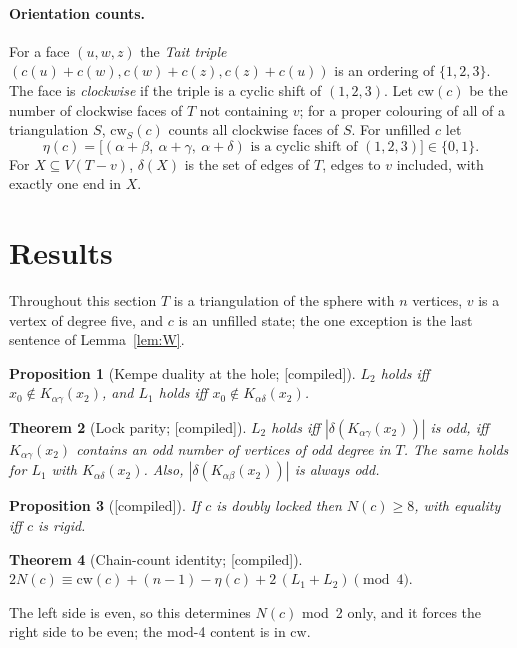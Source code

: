 \documentclass[11pt]{article}
\newtheorem{theorem}{Theorem}
\newtheorem{proposition}[theorem]{Proposition}
\theoremstyle{definition}
\newcommand{\lab}[1]{\textsf{[#1]}}
\newcommand{\cw}{\mathrm{cw}}
\begin{document}
\paragraph{Orientation counts.} For a face $(u,w,z)$ the \emph{Tait triple} $(c(u){+}c(w),c(w){+}c(z),c(z){+}c(u))$ is an ordering of $\{1,2,3\}$. The face is \emph{clockwise} if the triple is a cyclic shift of $(1,2,3)$. Let $\cw(c)$ be the number of clockwise faces of $T$ not containing $v$; for a proper colouring of all of a triangulation $S$, $\cw_S(c)$ counts all clockwise faces of $S$. For unfilled $c$ let
\[\eta(c)=\big[(\alpha{+}\beta,\ \alpha{+}\gamma,\ \alpha{+}\delta)\text{ is a cyclic shift of }(1,2,3)\big]\in\{0,1\}.\]
For $X\subseteq V(T-v)$, $\delta(X)$ is the set of edges of $T$, edges to $v$ included, with exactly one end in $X$.

\section{Results}\label{sec:results}
Throughout this section $T$ is a triangulation of the sphere with $n$ vertices, $v$ is a vertex of degree five, and $c$ is an unfilled state; the one exception is the last sentence of Lemma~\ref{lem:W}.

\begin{proposition}[Kempe duality at the hole; \lab{compiled}]\label{prop:D}
$L_2$ holds iff $x_0\notin K_{\alpha\gamma}(x_2)$, and $L_1$ holds iff $x_0\notin K_{\alpha\delta}(x_2)$.
\end{proposition}

\begin{theorem}[Lock parity; \lab{compiled}]\label{thm:LP}
$L_2$ holds iff $|\delta(K_{\alpha\gamma}(x_2))|$ is odd, iff $K_{\alpha\gamma}(x_2)$ contains an odd number of vertices of odd degree in $T$. The same holds for $L_1$ with $K_{\alpha\delta}(x_2)$. Also, $|\delta(K_{\alpha\beta}(x_2))|$ is always odd.
\end{theorem}

\begin{proposition}[\lab{compiled}]\label{prop:eight}
If $c$ is doubly locked then $N(c)\ge 8$, with equality iff $c$ is rigid.
\end{proposition}

\begin{theorem}[Chain-count identity; \lab{compiled}]\label{thm:F}
$\displaystyle 2N(c)\equiv \cw(c)+(n-1)-\eta(c)+2\,(L_1+L_2)\pmod 4.$
\end{theorem}
The left side is even, so this determines $N(c)$ mod~2 only, and it forces the right side to be even; the mod-4 content is in $\cw$.
\end{document}
